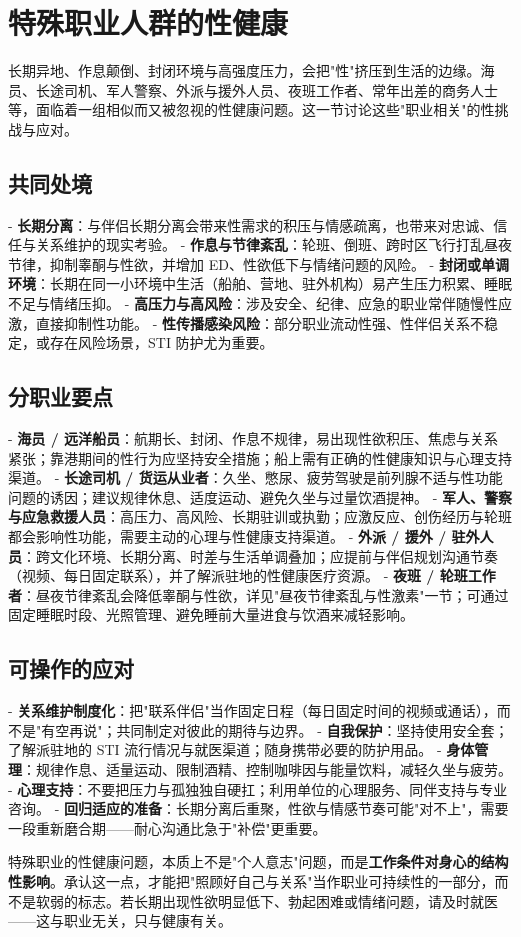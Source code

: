 \section{特殊职业人群的性健康}

长期异地、作息颠倒、封闭环境与高强度压力，会把"性"挤压到生活的边缘。海员、长途司机、军人警察、外派与援外人员、夜班工作者、常年出差的商务人士等，面临着一组相似而又被忽视的性健康问题。这一节讨论这些"职业相关"的性挑战与应对。

\subsection{共同处境}

- \textbf{长期分离}：与伴侣长期分离会带来性需求的积压与情感疏离，也带来对忠诚、信任与关系维护的现实考验。
- \textbf{作息与节律紊乱}：轮班、倒班、跨时区飞行打乱昼夜节律，抑制睾酮与性欲，并增加 ED、性欲低下与情绪问题的风险。
- \textbf{封闭或单调环境}：长期在同一小环境中生活（船舶、营地、驻外机构）易产生压力积累、睡眠不足与情绪压抑。
- \textbf{高压力与高风险}：涉及安全、纪律、应急的职业常伴随慢性应激，直接抑制性功能。
- \textbf{性传播感染风险}：部分职业流动性强、性伴侣关系不稳定，或存在风险场景，STI 防护尤为重要。

\subsection{分职业要点}

- \textbf{海员 / 远洋船员}：航期长、封闭、作息不规律，易出现性欲积压、焦虑与关系紧张；靠港期间的性行为应坚持安全措施；船上需有正确的性健康知识与心理支持渠道。
- \textbf{长途司机 / 货运从业者}：久坐、憋尿、疲劳驾驶是前列腺不适与性功能问题的诱因；建议规律休息、适度运动、避免久坐与过量饮酒提神。
- \textbf{军人、警察与应急救援人员}：高压力、高风险、长期驻训或执勤；应激反应、创伤经历与轮班都会影响性功能，需要主动的心理与性健康支持渠道。
- \textbf{外派 / 援外 / 驻外人员}：跨文化环境、长期分离、时差与生活单调叠加；应提前与伴侣规划沟通节奏（视频、每日固定联系），并了解派驻地的性健康医疗资源。
- \textbf{夜班 / 轮班工作者}：昼夜节律紊乱会降低睾酮与性欲，详见"昼夜节律紊乱与性激素"一节；可通过固定睡眠时段、光照管理、避免睡前大量进食与饮酒来减轻影响。

\subsection{可操作的应对}

- \textbf{关系维护制度化}：把"联系伴侣"当作固定日程（每日固定时间的视频或通话），而不是"有空再说"；共同制定对彼此的期待与边界。
- \textbf{自我保护}：坚持使用安全套；了解派驻地的 STI 流行情况与就医渠道；随身携带必要的防护用品。
- \textbf{身体管理}：规律作息、适量运动、限制酒精、控制咖啡因与能量饮料，减轻久坐与疲劳。
- \textbf{心理支持}：不要把压力与孤独独自硬扛；利用单位的心理服务、同伴支持与专业咨询。
- \textbf{回归适应的准备}：长期分离后重聚，性欲与情感节奏可能"对不上"，需要一段重新磨合期——耐心沟通比急于"补偿"更重要。

\begin{tcolorbox}[colback=pink!5!white,colframe=red!50!black,title=贴心小叮咛]
特殊职业的性健康问题，本质上不是"个人意志"问题，而是\textbf{工作条件对身心的结构性影响}。承认这一点，才能把"照顾好自己与关系"当作职业可持续性的一部分，而不是软弱的标志。若长期出现性欲明显低下、勃起困难或情绪问题，请及时就医——这与职业无关，只与健康有关。
\end{tcolorbox}
